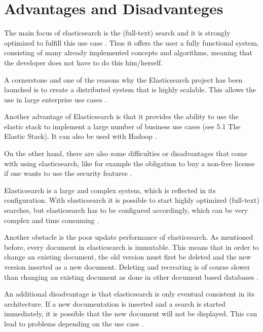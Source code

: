 \chapter{Advantages and Disadvanteges}

The main focus of elasticsearch is the (full-text) search and it is strongly optimized to fulfill this use case \autocite{andrewcholakian2019}. Thus it offers the user a fully functional system, consisting of many already implemented concepts and algorithms, meaning that the developer does not have to do this him/herself.

A cornerstone and one of the reasons why the Elasticsearch project has been launched is to create a distributed system that is highly scalable. This allows the use in large enterprise use cases \autocite{shaybanon2019}.

Another advantage of Elasticsearch is that it provides the ability to use the elastic stack to implement a large number of business use cases (see 5.1 The Elastic Stack). It can also be used with Hadoop \autocite{elasticsearch_hadoop}.


On the other hand, there are also some difficulties or disadvantages that come with using elasticsearch, like for example the obligation to buy a non-free license if one wants to use the security features \autocite{elasticsearc_sec}.

Elasticsearch is a large and complex system, which is reflected in its configuration. With elasticsearch it is possible to start highly optimized (full-text) searches, but elasticsearch has to be configured accordingly, which can be very complex and time consuming \autocite{logz.io2019}.

Another obstacle is the poor update performance of elasticsearch. As mentioned before, every document in elasticsearch is immutable. This means that in order to change an existing document, the old version must first be deleted and the new version inserted as a new document. Deleting and recreating is of course slower than changing an existing document as done in other document based databases \autocite{elasticsearchb.v.2019}.

An additional disadvantage is that elasticsearch is only eventual consistent in its architecture. If a new documentation is inserted and a search is started immediately, it is possible that the new document will not be displayed. This can lead to problems depending on the use case \autocite{sunilkappal2019}.

